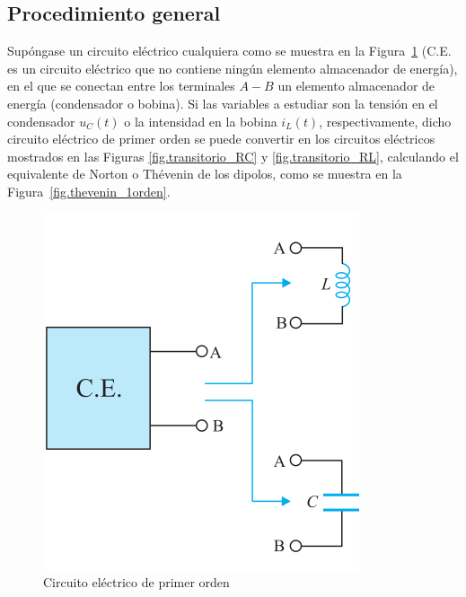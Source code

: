 
	
	
	
	
	
	
	
	
\subsection{Procedimiento general}
	
Supóngase un circuito eléctrico cualquiera como se muestra en la
Figura~\ref{fig.CE_primerorden} (C.E. es un circuito eléctrico que no
contiene ningún elemento almacenador de energía), en el que se
conectan entre los terminales $A-B$ un elemento almacenador de energía
(condensador o bobina). Si las variables a estudiar son la tensión en
el condensador $u_C(t)$ o la intensidad en la bobina $i_L(t)$,
respectivamente, dicho circuito eléctrico de primer orden se puede
convertir en los circuitos eléctricos mostrados en las Figuras
\ref{fig.transitorio_RC} y \ref{fig.transitorio_RL}, calculando el
equivalente de Norton o Thévenin de los dipolos, como se muestra en la
Figura~\ref{fig.thevenin_1orden}.
\begin{figure}[H]
  \centering
  \includegraphics[width=0.3\linewidth]{../figs/CE_primerorden.pdf}
  \caption{Circuito eléctrico de primer
    orden} \label{fig.CE_primerorden}
\end{figure}
	
